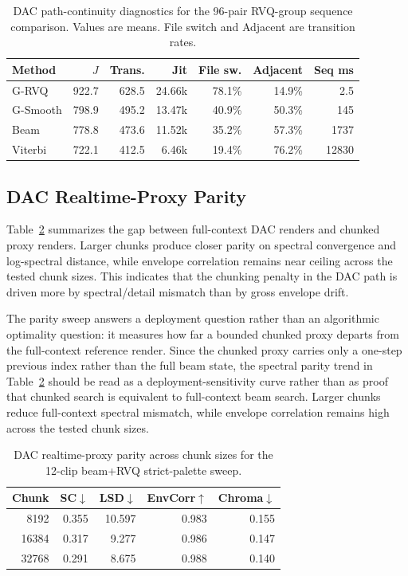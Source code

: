 \documentclass[twoside,a4paper]{article}
\begin{document}
\begin{table}[!t]
    \centering
    \scriptsize
    \setlength{\tabcolsep}{2pt}
    \caption{DAC path-continuity diagnostics for the 96-pair RVQ-group sequence comparison. Values are means. File switch and Adjacent are transition rates.}
    \label{tab:dac-path}
    \begin{tabular}{lrrrrrr}
    \toprule
    Method & $J$ & Trans. & Jit & File sw. & Adjacent & Seq ms \\
    \midrule
    G-RVQ & 922.7 & 628.5 & 24.66k & 78.1\% & 14.9\% & 2.5 \\
    G-Smooth & 798.9 & 495.2 & 13.47k & 40.9\% & 50.3\% & 145 \\
    Beam & 778.8 & 473.6 & 11.52k & 35.2\% & 57.3\% & 1737 \\
    Viterbi & 722.1 & 412.5 & 6.46k & 19.4\% & 76.2\% & 12830 \\
    \bottomrule
    \end{tabular}
\end{table}

\FloatBarrier

\subsection{DAC Realtime-Proxy Parity}

Table~\ref{tab:dac-parity} summarizes the gap between full-context DAC renders and chunked proxy renders. Larger chunks produce closer parity on spectral convergence and log-spectral distance, while envelope correlation remains near ceiling across the tested chunk sizes. This indicates that the chunking penalty in the DAC path is driven more by spectral/detail mismatch than by gross envelope drift.

The parity sweep answers a deployment question rather than an algorithmic optimality question: it measures how far a bounded chunked proxy departs from the full-context reference render. Since the chunked proxy carries only a one-step previous index rather than the full beam state, the spectral parity trend in Table~\ref{tab:dac-parity} should be read as a deployment-sensitivity curve rather than as proof that chunked search is equivalent to full-context beam search. Larger chunks reduce full-context spectral mismatch, while envelope correlation remains high across the tested chunk sizes.

\begin{table}[!t]
    \centering
    \small
    \caption{DAC realtime-proxy parity across chunk sizes for the 12-clip beam+RVQ strict-palette sweep.}
    \label{tab:dac-parity}
    \begin{tabular}{rrrrr}
    \toprule
    Chunk & SC$\downarrow$ & LSD$\downarrow$ & EnvCorr$\uparrow$ & Chroma$\downarrow$ \\
    \midrule
    8192 & 0.355 & 10.597 & 0.983 & 0.155 \\
    16384 & 0.317 & 9.277 & 0.986 & 0.147 \\
    32768 & 0.291 & 8.675 & 0.988 & 0.140 \\
    \bottomrule
    \end{tabular}
\end{table}
\end{document}
